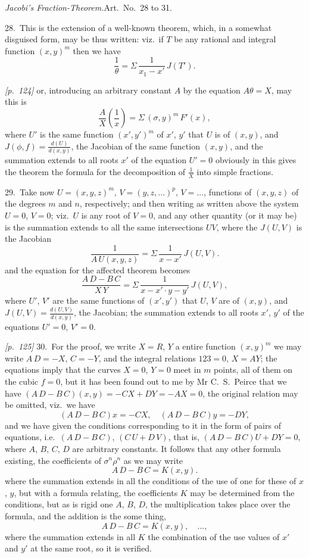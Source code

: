 \documentclass[11pt,a4paper]{book}
\begin{document}
\textit{Jacobi's Fraction-Theorem.}\quad Art.\ No.~28 to 31.

28.\ This is the extension of a well-known theorem, which, in a somewhat disguised form, may be thus written: viz.\ if $T$ be any rational and integral function $(x, y)^m$ then we have
\[
\frac{1}{\theta} = \Sigma\,\frac{1}{x_1 - x'}\,J(T').
\]

\noindent\textit{[p.~124]} or, introducing an arbitrary constant $A$ by the equation $A\theta = X$, may this is
\[
\frac{A}{X}\left(\frac{1}{x}\right) = \Sigma\,(\sigma, y)^{m}\,F'(x),
\]
where $U'$ is the same function $(x', y')^m$ of $x'$, $y'$ that $U$ is of $(x, y)$, and $J(\phi, f) = \frac{d(U)}{d(x, y)}$, the Jacobian of the same function $(x, y)$, and the summation extends to all roots $x'$ of the equation $U' = 0$ obviously in this gives the theorem the formula for the decomposition of $\frac{1}{X}$ into simple fractions.

29.\ Take now $U = (x, y, z)^m$, $V = (y, z, ...)^p$, $V = ...$, functions of $(x, y, z)$ of the degrees $m$ and $n$, respectively; and then writing as written above the system $U = 0$, $V = 0$; viz.\ $U$ is any root of $V = 0$, and any other quantity (or it may be) is the summation extends to all the same intersections $UV$, where the $J(U, V)$ is the Jacobian
\[
\frac{1}{A\,U(x, y, z)} = \Sigma\,\frac{1}{x - x'}\,J(U, V).
\]
and the equation for the affected theorem becomes
\[
\frac{A\,D - B\,C}{X\,Y} = \Sigma\,\frac{1}{x - x'\cdot y - y'}\,J(U, V),
\]
where $U'$, $V'$ are the same functions of $(x', y')$ that $U$, $V$ are of $(x, y)$, and $J(U, V) = \frac{d(U, V)}{d(x, y)}$, the Jacobian; the summation extends to all roots $x'$, $y'$ of the equations $U' = 0$, $V' = 0$.

\noindent\textit{[p.~125]} 30.\ For the proof, we write $X = R$, $Y$ a entire function $(x, y)^m$ we may write $A\,D = -X$, $C = -Y$, and the integral relations $123 = 0$, $X = AY$; the equations imply that the curves $X = 0$, $Y = 0$ meet in $m$ points, all of them on the cubic $f = 0$, but it has been found out to me by Mr C.\ S.\ Peirce that we have $(A\,D - B\,C)(x, y) = -CX + DY = -AX = 0$, the original relation may be omitted, viz.\ we have
\[
(A\,D - B\,C)x = -CX,\quad (A\,D - B\,C)y = -DY,
\]
and we have given the conditions corresponding to it in the form of pairs of equations, i.e.\ $(A\,D - B\,C)$, $(C\,U + D\,V)$, that is, $(A\,D - B\,C)U + DY = 0$, where $A$, $B$, $C$, $D$ are arbitrary constants. It follows that any other formula existing, the coefficients of $\sigma^n \rho^n$ as we may write
\[
A\,D - B\,C = K(x, y).
\]
where the summation extends in all the conditions of the use of one for these of $x$, $y$, but with a formula relating, the coefficients $K$ may be determined from the conditions, but as is rigid one $A$, $B$, $D$, the multiplication takes place over the formula, and the addition is the some thing,
\[
A\,D - B\,C = K(x, y), \quad ...,
\]
where the summation extends in all $K$ the combination of the use values of $x'$ and $y'$ at the same root, so it is verified.
\end{document}
